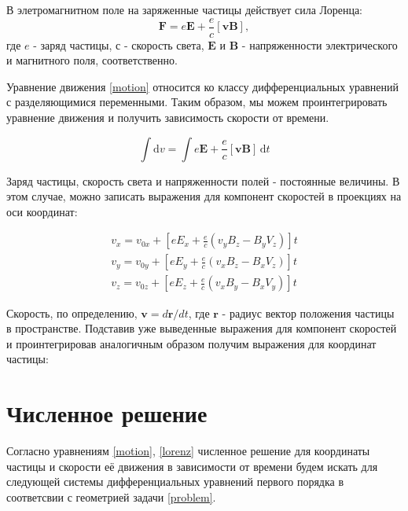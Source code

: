 \documentclass[a4paper]{article}
\begin{document}
В элетромагнитном поле на заряженные частицы действует сила Лоренца:
\begin{equation}\label{lorenz}
\mathbf{F} = e \mathbf{E} + \frac{e}{c}\left[\mathbf{vB}\right],
\end{equation}
где $e$ - заряд частицы, $с$ - скорость света, $\mathbf{E}$ и $\mathbf{B}$ - напряженности электрического и магнитного поля, соответственно.

Уравнение движения \eqref{motion} относится ко классу дифференциальных уравнений с разделяющимися переменными. Таким образом, мы можем проинтегрировать уравнение движения и получить зависимость скорости от времени.

\begin{equation}\label{intmotion}
\int \mathrm{d}v =\int e \mathbf{E} + \frac{e}{c}\left[\mathbf{vB}\right] \, \mathrm{d}t
\end{equation}

Заряд частицы, скорость света и напряженности полей - постоянные величины. В этом случае, можно записать выражения для компонент скоростей в проекциях на оси координат:

\begin{equation}\label{velocity_components}
\begin{aligned}
v_x = v_{0x} + \left[ e E_x + \frac{e}{c} \left( v_y B_z - B_y V_z \right) \right] t \\
v_y = v_{0y} + \left[ e E_y + \frac{e}{c} \left( v_x B_z - B_x V_z \right) \right] t \\
v_z = v_{0z} + \left[ e E_z + \frac{e}{c} \left( v_x B_y - B_x V_y \right) \right] t
\end{aligned}
\end{equation}

Скорость, по определению, $\mathbf{v} = d\mathbf{r}/dt$, где $\mathbf{r}$ - радиус вектор положения частицы в пространстве. Подставив уже выведенные выражения для компонент скоростей и проинтегрировав аналогичным образом получим выражения для координат частицы:




\section{Численное решение}

Согласно уравнениям \eqref{motion}, \eqref{lorenz} численное решение для координаты частицы и скорости её движения в зависимости от времени будем искать для следующей системы дифференциальных уравнений первого порядка в соответсвии с геометрией задачи \ref{problem}.
\end{document}

